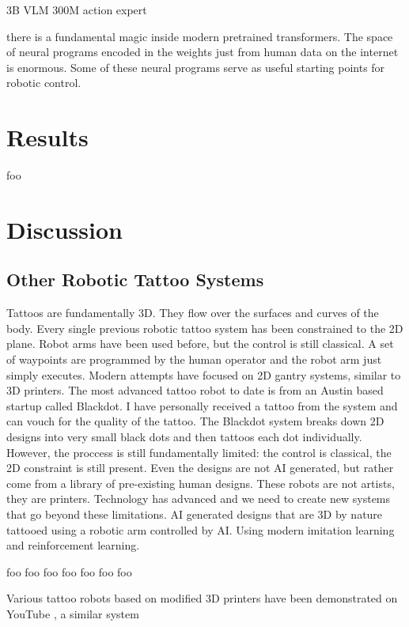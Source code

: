 \documentclass[11pt]{article}
\begin{document}
3B VLM
300M action expert

there is a fundamental magic inside modern pretrained transformers.
The space of neural programs encoded in the weights just from human data on the internet is enormous. 
Some of these neural programs serve as useful starting points for robotic control.

\section{Results}

foo

\section{Discussion}

\subsection{Other Robotic Tattoo Systems}

Tattoos are fundamentally 3D. They flow over the surfaces and curves of the body. Every single previous robotic tattoo system has been constrained to the 2D plane.
Robot arms have been used before, but the control is still classical.
A set of waypoints are programmed by the human operator and the robot arm just simply executes.
Modern attempts have focused on 2D gantry systems, similar to 3D printers.
The most advanced tattoo robot to date is from an Austin based startup called Blackdot.
I have personally received a tattoo from the system and can vouch for the quality of the tattoo.
The Blackdot system breaks down 2D designs into very small black dots and then tattoos each dot individually.
However, the proccess is still fundamentally limited: the control is classical, the 2D constraint is still present.
Even the designs are not AI generated, but rather come from a library of pre-existing human designs.
These robots are not artists, they are printers.
Technology has advanced and we need to create new systems that go beyond these limitations.
AI generated designs that are 3D by nature tattooed using a robotic arm controlled by AI.
Using modern imitation learning and reinforcement learning.

foo \cite{NietoBastida2023}
foo \cite{arar2025swiftsketch}
foo \cite{carlier2020deepsvg}
foo \cite{mellor2020unsupervised}
foo \cite{ha2017neural}
foo \cite{huang2019learning}
foo \cite{kotani2019teaching}

Various tattoo robots based on modified 3D printers have been demonstrated on YouTube \cite{EmilyTheEngineer2025}, a similar system \cite{YamanDeif2021}
\end{document}
